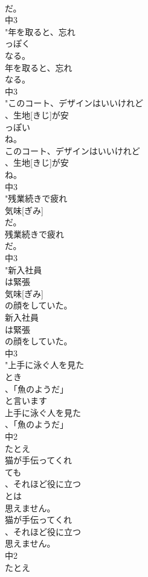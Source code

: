 \documentclass[8pt]{extreport}
\begin{document}
\begin{CJK}{UTF8}{min}
\\	だ。
\\	中3
\\	"年を取ると、忘れ
\\	っぽく
\\	なる。
\\	年を取ると、忘れ
\\	なる。
\\	中3
\\	"このコート、デザインはいいけれど
\\	、生地[きじ]が安
\\	っぽい
\\	ね。
\\	このコート、デザインはいいけれど
\\	、生地[きじ]が安
\\	ね。
\\	中3
\\	"残業続きで疲れ
\\	気味[ぎみ]
\\	だ。
\\	残業続きで疲れ
\\	だ。
\\	中3
\\	"新入社員
\\	は緊張
\\	気味[ぎみ]
\\	の顔をしていた。
\\	新入社員
\\	は緊張
\\	の顔をしていた。
\\	中3
\\	"上手に泳ぐ人を見た
\\	とき
\\	、「魚のようだ」
\\	と言います
\\	上手に泳ぐ人を見た
\\	、「魚のようだ」
\\	中2
\\	たとえ
\\	猫が手伝ってくれ
\\	ても
\\	、それほど役に立つ
\\	とは
\\	思えません。
\\	猫が手伝ってくれ
\\	、それほど役に立つ
\\	思えません。
\\	中2
\\	たとえ

\end{CJK}
\end{document}
